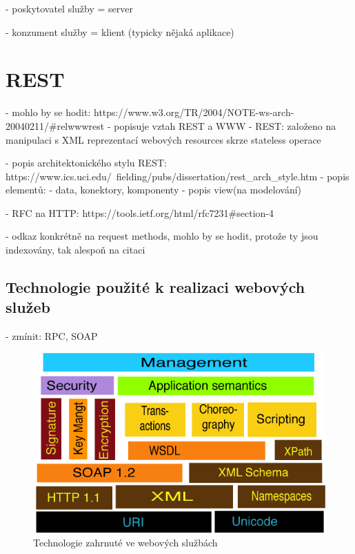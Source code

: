\documentclass[czech,DP]{thesiskiv}
\begin{document}

- poskytovatel služby = server

- konzument služby = klient (typicky nějaká aplikace)


\section{REST}

%

- mohlo by se hodit: https://www.w3.org/TR/2004/NOTE-ws-arch-20040211/\#relwwwrest
- popisuje vztah REST a WWW
- REST: založeno na manipulaci s XML reprezentací webových resources skrze stateless operace

 - popis architektonického stylu REST: https://www.ics.uci.edu/~fielding/pubs/dissertation/rest\_arch\_style.htm
- popis elementů:
- data, konektory, komponenty
- popis view(na modelování)

- RFC na HTTP: https://tools.ietf.org/html/rfc7231\#section-4

- odkaz konkrétně na request methods, mohlo by se hodit, protože ty jsou indexovány, tak alespoň na citaci

\subsection{Technologie použité k realizaci webových služeb}

- zmínit: RPC, SOAP

\begin{figure}
	\centering
	\includegraphics[width=\linewidth]{ws-tech-stack.png}
	\caption{Technologie zahrnuté ve webových službách}
	\label{fig:ws-tech-stack}	
\end{figure}
\end{document}
